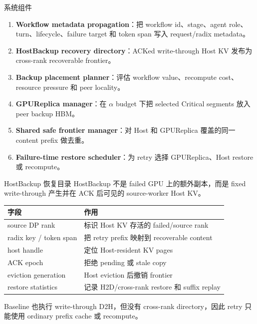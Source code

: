 \documentclass[aspectratio=43]{beamer}
\newcommand{\tightitems}{\setlength{\itemsep}{2pt}\setlength{\parskip}{0pt}}
\newcommand{\Critical}{Critical}
\newcommand{\HostBackup}{HostBackup}
\begin{document}
\begin{frame}{系统组件}
  \small
  \begin{enumerate}
    \tightitems
    \item \textbf{Workflow metadata propagation}：把 workflow id、stage、agent role、turn、lifecycle、failure target 和 token span 写入 request/radix metadata。
    \item \textbf{HostBackup recovery directory}：ACKed write-through Host KV 发布为 cross-rank recoverable frontier。
    \item \textbf{Backup placement planner}：评估 workflow value、recompute cost、resource pressure 和 peer locality。
    \item \textbf{GPUReplica manager}：在 $\alpha$ budget 下把 selected \Critical{} segments 放入 peer backup HBM。
    \item \textbf{Shared safe frontier manager}：对 Host 和 GPUReplica 覆盖的同一 content prefix 做去重。
    \item \textbf{Failure-time restore scheduler}：为 retry 选择 GPUReplica、Host restore 或 recompute。
  \end{enumerate}
\end{frame}

\begin{frame}{HostBackup 恢复目录}
  \small
  \HostBackup{} 不是 failed GPU 上的额外副本，而是 fixed write-through 产生并在 ACK 后可见的 source-worker Host KV。

  \vspace{0.12cm}
  \scriptsize
  \renewcommand{\arraystretch}{1.10}
  \begin{tabular}{p{}p{}}
    \toprule
    字段 & 作用 \\
    \midrule
    source DP rank & 标识 Host KV 存活的 failed/source rank \\
    radix key / token span & 把 retry prefix 映射到 recoverable content \\
    host handle & 定位 Host-resident KV pages \\
    ACK epoch & 拒绝 pending 或 stale copy \\
    eviction generation & Host eviction 后撤销 frontier \\
    restore statistics & 记录 H2D/cross-rank restore 和 suffix replay \\
    \bottomrule
  \end{tabular}

  \vspace{0.12cm}
  \footnotesize
  Baseline 也执行 write-through D2H，但没有 cross-rank directory，因此 retry 只能使用 ordinary prefix cache 或 recompute。
\end{frame}
\end{document}
